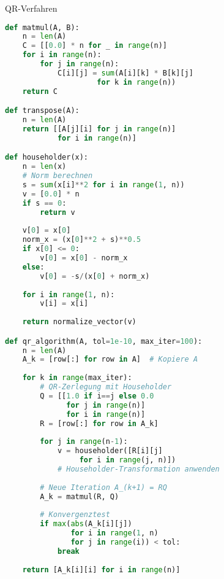 \begin{examplecode}{QR-Verfahren}
\begin{lstlisting}[language=Python, style=basesmol]
def matmul(A, B):
    n = len(A)
    C = [[0.0] * n for _ in range(n)]
    for i in range(n):
        for j in range(n):
            C[i][j] = sum(A[i][k] * B[k][j] 
                     for k in range(n))
    return C

def transpose(A):
    n = len(A)
    return [[A[j][i] for j in range(n)] 
            for i in range(n)]

def householder(x):
    n = len(x)
    # Norm berechnen
    s = sum(x[i]**2 for i in range(1, n))
    v = [0.0] * n
    if s == 0:
        return v
    
    v[0] = x[0]
    norm_x = (x[0]**2 + s)**0.5
    if x[0] <= 0:
        v[0] = x[0] - norm_x
    else:
        v[0] = -s/(x[0] + norm_x)
    
    for i in range(1, n):
        v[i] = x[i]
    
    return normalize_vector(v)

def qr_algorithm(A, tol=1e-10, max_iter=100):
    n = len(A)
    A_k = [row[:] for row in A]  # Kopiere A
    
    for k in range(max_iter):
        # QR-Zerlegung mit Householder
        Q = [[1.0 if i==j else 0.0 
              for j in range(n)] 
              for i in range(n)]
        R = [row[:] for row in A_k]
        
        for j in range(n-1):
            v = householder([R[i][j] 
                 for i in range(j, n)])
            # Householder-Transformation anwenden
            
        # Neue Iteration A_(k+1) = RQ
        A_k = matmul(R, Q)
        
        # Konvergenztest
        if max(abs(A_k[i][j]) 
               for i in range(1, n) 
               for j in range(i)) < tol:
            break
    
    return [A_k[i][i] for i in range(n)]
\end{lstlisting}
\end{examplecode}
